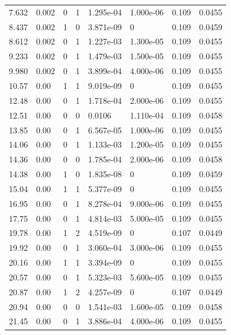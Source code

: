 \documentclass[preview]{standalone}
\begin{document}
{{\begin{tabular}{L{1.2cm}C{1.2cm} C{0.3cm}C{0.5cm} C{1.4cm}C{1.4cm} C{1.4cm}C{1.4cm}}
  7.632  &  0.002  & 0     &  1 &  1.295e-04  & 1.000e-06  & 0.109 &  0.0455   \\ 
  8.437  &  0.002  & 1     &  0 &  3.871e-09  & 0  & 0.109 &  0.0459   \\ 
  8.612  &  0.002  & 0     &  1 &  1.227e-03  & 1.300e-05  & 0.109 &  0.0455   \\ 
  9.233  &  0.002  & 0     &  1 &  1.479e-03  & 1.500e-05  & 0.109 &  0.0455   \\ 
  9.980  &  0.002  & 0     &  1 &  3.899e-04  & 4.000e-06  & 0.109 &  0.0455   \\ 
  10.57  &  0.00  & 1     &  1 &  9.019e-09  & 0  & 0.109 &  0.0455   \\ 
  12.48  &  0.00  & 0     &  1 &  1.718e-04  & 2.000e-06  & 0.109 &  0.0455   \\ 
  12.51  &  0.00  & 0     &  0 &  0.0106  & 1.110e-04  & 0.109 &  0.0458   \\ 
  13.85  &  0.00  & 0     &  1 &  6.567e-05  & 1.000e-06  & 0.109 &  0.0455   \\ 
  14.06  &  0.00  & 0     &  1 &  1.133e-03  & 1.200e-05  & 0.109 &  0.0455   \\ 
  14.36  &  0.00  & 0     &  0 &  1.785e-04  & 2.000e-06  & 0.109 &  0.0458   \\ 
  14.38  &  0.00  & 1     &  0 &  1.835e-08  & 0  & 0.109 &  0.0459   \\ 
  15.04  &  0.00  & 1     &  1 &  5.377e-09  & 0  & 0.109 &  0.0455   \\ 
  16.95  &  0.00  & 0     &  1 &  8.278e-04  & 9.000e-06  & 0.109 &  0.0455   \\ 
  17.75  &  0.00  & 0     &  1 &  4.814e-03  & 5.000e-05  & 0.109 &  0.0455   \\ 
  19.78  &  0.00  & 1     &  2 &  4.519e-09  & 0  & 0.107 &  0.0449   \\ 
  19.92  &  0.00  & 0     &  1 &  3.060e-04  & 3.000e-06  & 0.109 &  0.0455   \\ 
  20.16  &  0.00  & 1     &  1 &  3.394e-09  & 0  & 0.109 &  0.0455   \\ 
  20.57  &  0.00  & 0     &  1 &  5.323e-03  & 5.600e-05  & 0.109 &  0.0455   \\ 
  20.87  &  0.00  & 1     &  2 &  4.257e-09  & 0  & 0.107 &  0.0449   \\ 
  20.94  &  0.00  & 0     &  0 &  1.541e-03  & 1.600e-05  & 0.109 &  0.0458   \\ 
  21.45  &  0.00  & 0     &  1 &  3.886e-04  & 4.000e-06  & 0.109 &  0.0455   \\ 

\end{tabular}}}
\end{document}
